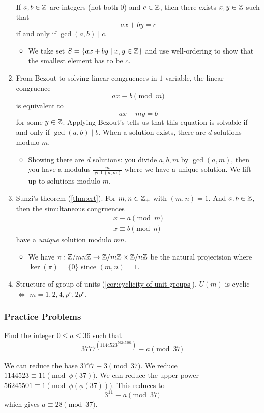 \begin{enumerate}[1)]
          If $a, b\in\mathbb Z$ are integers (not both $0$) and $c\in \mathbb Z$, then there exists $x, y\in\mathbb Z$ such that
          \[ax + by = c\]
          if and only if $\gcd(a, b)\mid c$.
          \begin{itemize}
              \item We take set $S = \{ax + by\mid x, y\in\mathbb Z\}$ and use well-ordering to show that the smallest element has to be $c$.
          \end{itemize}
    \item
          From Bezout to solving linear congruences in $1$ variable, the linear congruence
          \[ax\equiv b\pmod{m}\]
          is equivalent to
          \[ax - my = b\]
          for some $y\in \mathbb Z$. Applying Bezout's tells us that this equation is solvable if and only if $\gcd(a, b)\mid b$. When a solution exists, there are $d$ solutions modulo $m$.
          \begin{itemize}
              \item Showing there are $d$ solutions: you divide $a, b, m$ by $\gcd(a, m)$, then you have a modulus $\frac{m}{\gcd(a, m)}$ where we have a unique solution. We lift up to solutions modulo $m$.
          \end{itemize}
    \item
          Sunzi's theorem (\cref{thm:crt}). For $m, n\in\mathbb Z_+$ with $(m, n) = 1$. And $a, b\in\mathbb Z$, then the simultaneous congruences
          \begin{align*}
              x\equiv a\pmod{m} \\
              x\equiv b\pmod{n}
          \end{align*}
          have a \emph{unique} solution modulo $mn$.
          \begin{itemize}
              \item We have $\pi : \mathbb Z/mn\mathbb Z\to \mathbb Z/m\mathbb Z\times \mathbb Z/n\mathbb Z$ be the natural projectsion where $\ker(\pi) = \{0\}$ since $(m, n) = 1$.
          \end{itemize}
    \item
          Structure of group of units (\cref{cor:cyclicity-of-unit-groups}). $U(m)$ is cyclic $\iff$ $m = 1, 2, 4, p^e, 2p^e$.
\end{enumerate}

\subsubsection*{Practice Problems}
\begin{problem}
Find the integer $0\leq a\leq 36$ such that
\[3777^{\left(1144523^{56245501}\right)} \equiv a\pmod{37}\]
\end{problem}
We can reduce the base $3777\equiv 3\pmod{37}$. We reduce $1144523\equiv 11\pmod{\phi(37)}$. We can reduce the upper power $56245501\equiv 1\pmod{\phi(\phi(37))}$. This reduces to
\[3^{11}\equiv a\pmod{37}\]
which gives $a\equiv 28\pmod{37}$.

